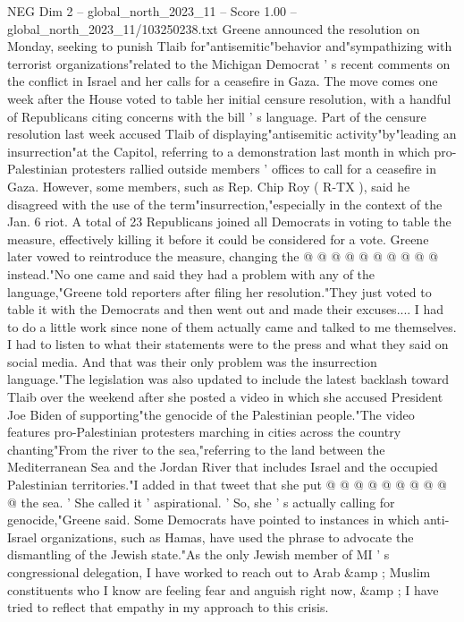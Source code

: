 \begin{textsample}{NEG Dim 2 – global\_north\_2023\_11 – Score 1.00 – global\_north\_2023\_11/103250238.txt}  \label{ex:f2_neg_214}
Greene announced the resolution on Monday, seeking to punish Tlaib for"antisemitic"behavior and"sympathizing with terrorist organizations"related to the Michigan Democrat ' s recent comments on the conflict in Israel and her calls for a ceasefire in Gaza.
The move comes one week after the House voted to table her initial censure resolution, with a handful of Republicans citing concerns with the bill ' s language.
Part of the censure resolution last week accused Tlaib of displaying"antisemitic activity"by"leading an insurrection"at the Capitol, referring to a demonstration last month in which pro-Palestinian protesters rallied outside members ' offices to call for a ceasefire in Gaza.
However, some members, such as Rep.
Chip Roy ( R-TX ), said he disagreed with the use of the term"insurrection,"especially in the context of the Jan. 6 riot.
A total of 23 Republicans joined all Democrats in voting to table the measure, effectively killing it before it could be considered for a vote.
Greene later vowed to reintroduce the measure, changing the @ @ @ @ @ @ @ @ @ @ instead."No one came and said they had a problem with any of the language,"Greene told reporters after filing her resolution."They just voted to table it with the Democrats and then went out and made their excuses....
I had to do a little work since none of them actually came and talked to me themselves.
I had to listen to what their statements were to the press and what they said on social media.
And that was their only problem was the insurrection language."The legislation was also updated to include the latest backlash toward Tlaib over the weekend after she posted a video in which she accused President Joe Biden of supporting"the genocide of the Palestinian people."The video features pro-Palestinian protesters marching in cities across the country chanting"From the river to the sea,"referring to the land between the Mediterranean Sea and the Jordan River that includes Israel and the occupied Palestinian territories."I added in that tweet that she put @ @ @ @ @ @ @ @ @ @ the sea. ' She called it ' aspirational. ' So, she ' s actually calling for genocide,"Greene said.
Some Democrats have pointed to instances in which anti-Israel organizations, such as Hamas, have used the phrase to advocate the dismantling of the Jewish state."As the only Jewish member of MI ' s congressional delegation, I have worked to reach out to Arab \&amp ; Muslim constituents who I know are feeling fear and anguish right now, \&amp ; I have tried to reflect that empathy in my approach to this crisis.

\end{textsample}

